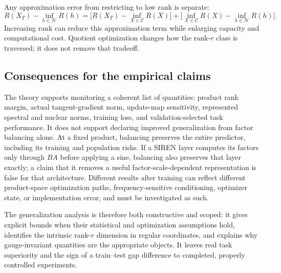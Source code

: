 Any approximation error from restricting to low rank is separate:
\begin{equation}
 R(X_T)-\inf_{h\in\mathcal H}R(h)
 =\big[R(X_T)-\inf_{X\in\mathcal C}R(X)\big]
  +\big[\inf_{X\in\mathcal C}R(X)-\inf_{h\in\mathcal H}R(h)\big].
\end{equation}
Increasing rank can reduce this approximation term while enlarging capacity
and computational cost. Quotient optimization changes how the rank-$r$
class is traversed; it does not remove that tradeoff.

\subsection{Consequences for the empirical claims}
The theory supports monitoring a coherent list of quantities: product rank
margin, actual tangent-gradient norm, update-map sensitivity, represented
spectral and nuclear norms, training loss, and validation-selected task
performance. It does not support declaring improved generalization from
factor balancing alone. At a fixed product, balancing preserves the entire
predictor, including its training and population risks. If a SIREN layer
computes its factors only through $BA$ before applying a sine, balancing
also preserves that layer exactly; a claim that it removes a useful
factor-scale-dependent representation is false for that architecture.
Different results after training can reflect different product-space
optimization paths, frequency-sensitive conditioning, optimizer state, or
implementation error, and must be investigated as such.

The generalization analysis is therefore both constructive and scoped:
it gives explicit bounds when their statistical and optimization assumptions
hold, identifies the intrinsic rank-$r$ dimension in regular coordinates,
and explains why gauge-invariant quantities are the appropriate objects.
It leaves real task superiority and the sign of a train--test gap difference
to completed, properly controlled experiments.
